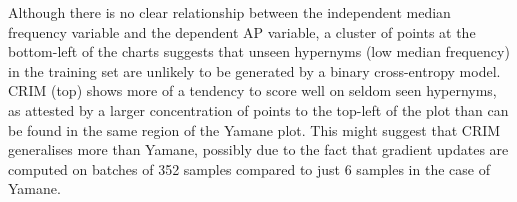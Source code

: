 Although there is no clear relationship between the independent median frequency variable and the dependent \ac{AP} variable, a cluster of points at the bottom-left of the charts suggests that unseen hypernyms (low median frequency) in the training set are unlikely to be generated by a binary cross-entropy model.  CRIM (top) shows more of a tendency to score well on seldom seen hypernyms, as attested by a larger concentration of points to the top-left of the plot than can be found in the same region of the Yamane plot.  This might suggest that CRIM generalises more than Yamane, possibly due to the fact that gradient updates are computed on batches of 352 samples compared to just 6 samples in the case of Yamane.

